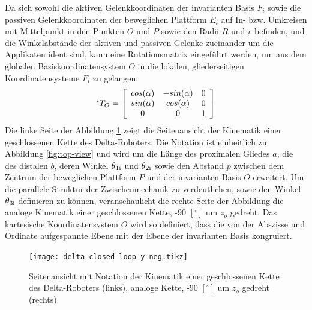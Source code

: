 \documentclass[Bachelor, BMR, ngerman]{twbook}
\begin{document}
    \noindent
    Da sich sowohl die aktiven Gelenkkoordinaten der invarianten Basis $F_i$ sowie die passiven Gelenkkoordinaten der beweglichen Plattform $E_i$ auf In- bzw. Umkreisen mit Mittelpunkt in den Punkten $O$ und $P$ sowie den Radii $R$ und $r$ befinden, und die Winkelabstände der aktiven und passiven Gelenke zueinander um die Applikaten ident sind, kann eine Rotationsmatrix eingeführt werden, um aus dem globalen Basiskoordinatensystem $O$ in die lokalen, gliederseitigen Koordinatensysteme $F_i$ zu gelangen:
    \begin{align}
        ^iT_O = 
            \left[
                \begin{array}{c c c} 
                    cos(\alpha) & - sin(\alpha) & 0 \\ 
                    sin(\alpha) & cos(\alpha) & 0 \\
                    0 & 0 & 1
                \end{array}
            \right]
        \label{eq:transformationsmatrix}
    \end{align}
    \noindent
    Die linke Seite der Abbildung \ref{fig:delta-closed-loop} zeigt die Seitenansicht der Kinematik einer geschlossenen Kette des Delta-Roboters. Die Notation ist einheitlich zu Abbildung \ref{fig:top-view} und wird um die Länge des proximalen Gliedes $a$, die des distalen $b$, deren Winkel $\theta\textsubscript{1i}$ und $\theta\textsubscript{2i}$ sowie den Abstand $p$ zwischen dem Zentrum der beweglichen Plattform $P$ und der invarianten Basis $O$ erweitert. Um die parallele Struktur der Zwischenmechanik zu verdeutlichen, sowie den Winkel $\theta\textsubscript{3i}$ definieren zu können, veranschaulicht die rechte Seite der Abbildung die analoge Kinematik einer geschlossenen Kette, -90 $[^{\circ}]$ um $z_o$ gedreht. Das kartesische Koordinatensystem $O$ wird so definiert, dass die  von der Abszisse und Ordinate aufgespannte Ebene mit der Ebene der invarianten Basis kongruiert.
    \begin{figure}[H]
        \centering
        {
            \texttt{[image: delta-closed-loop-y-neg.tikz]}
        }
        \caption[{Seitenansicht mit Notation der Kinematik einer geschlossenen Kette des Delta-Roboters (links), analoge Kette, -90 $[^{\circ}]$ um $z_o$ gedreht (rechts)}]{Seitenansicht mit Notation der Kinematik einer geschlossenen Kette des Delta-Roboters (links), analoge Kette, -90 $[^{\circ}]$ um $z_o$ gedreht (rechts)}
        \label{fig:delta-closed-loop}
    \end{figure}
\end{document}
